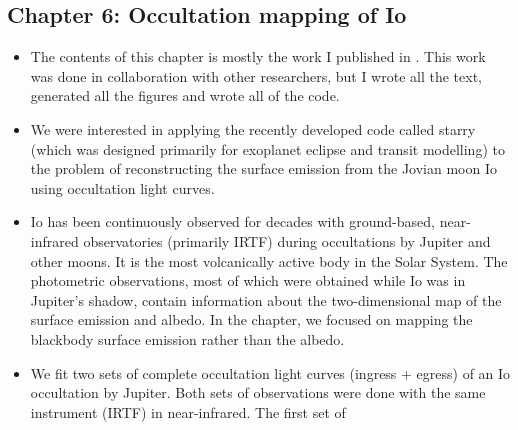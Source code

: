 \documentclass[12pt,dvipsnames]{report}
\newcommand{\ssf}[1]{\textsf{#1}}
\begin{document}
\subsection{Chapter 6: Occultation mapping of Io}
\begin{itemize}
\item The contents of this chapter is mostly the work I published in 
\citet{2022PSJ.....3...67B}. This work was done in collaboration with other researchers,
but I wrote all the text, generated all the figures and wrote all of the code.
\item We were interested in applying the recently developed code called \ssf{starry} (which was designed 
primarily for exoplanet eclipse and transit modelling) to the problem of reconstructing 
the surface emission from the Jovian moon Io using occultation light curves.
\item Io has been continuously observed for decades with ground-based, near-infrared 
observatories (primarily IRTF) during occultations by Jupiter and other moons. It is the 
most volcanically active body in the Solar System.
The photometric 
observations, most of which were obtained while Io was in Jupiter's shadow, 
contain information about the two-dimensional map of the surface emission and albedo.
In the chapter, we focused on mapping the blackbody surface emission rather than the albedo.
\item We fit two sets of complete occultation light curves 
(ingress + egress) of an Io occultation by Jupiter. Both sets of observations were done 
with the same instrument (IRTF) in near-infrared. The first set of 

\end{itemize}
\end{document}
